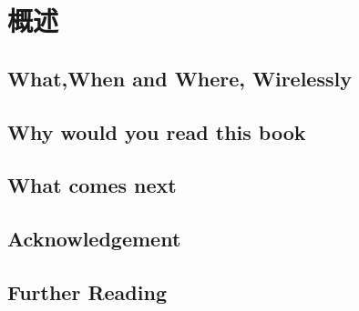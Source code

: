 \chapter{概述}


\section{What,When and Where, Wirelessly}

\section{Why would you read this book}

\section{What comes next}

\section*{Acknowledgement}

\section*{Further Reading}
